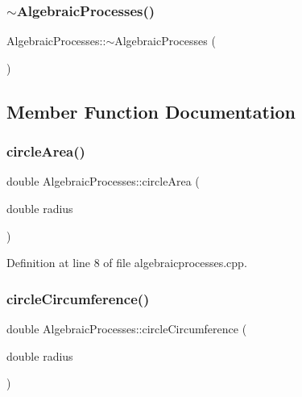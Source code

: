 \subsubsection{\texorpdfstring{$\sim$\+Algebraic\+Processes()}{~AlgebraicProcesses()}}
{\footnotesize\ttfamily Algebraic\+Processes\+::$\sim$\+Algebraic\+Processes (\begin{DoxyParamCaption}{ }\end{DoxyParamCaption})}



\subsection{Member Function Documentation}
\mbox{\label{class_algebraic_processes_a81cf98903ba3a162d0ed3560113989d5}} 
\subsubsection{\texorpdfstring{circle\+Area()}{circleArea()}}
{\footnotesize\ttfamily double Algebraic\+Processes\+::circle\+Area (\begin{DoxyParamCaption}\item[{double}]{radius }\end{DoxyParamCaption})}



Definition at line 8 of file algebraicprocesses.\+cpp.

\mbox{\label{class_algebraic_processes_a8930997d7ae198bc83766f3d9ca90441}} 
\subsubsection{\texorpdfstring{circle\+Circumference()}{circleCircumference()}}
{\footnotesize\ttfamily double Algebraic\+Processes\+::circle\+Circumference (\begin{DoxyParamCaption}\item[{double}]{radius }\end{DoxyParamCaption})}



